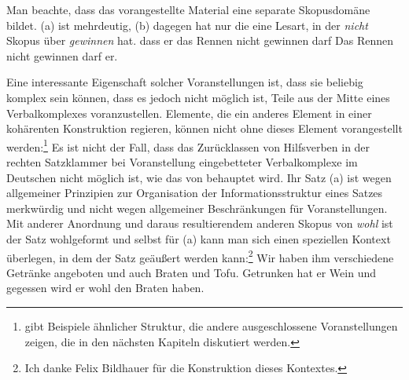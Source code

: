 Man beachte, dass das vorangestellte Material eine separate Skopusdomäne bildet.
(a) ist mehrdeutig, (b) dagegen hat nur die eine Lesart, in der \emph{nicht}
Skopus über \emph{gewinnen} hat.
\eal
\ex
dass er das Rennen nicht gewinnen darf
\ex
Das Rennen nicht gewinnen darf er.
\zl

\noindent
Eine interessante Eigenschaft solcher Voranstellungen ist, dass sie beliebig komplex
sein können, dass es jedoch nicht möglich ist, Teile aus der Mitte eines Verbalkomplexes
voranzustellen. Elemente, die ein anderes Element in einer kohärenten Konstruktion regieren,
können nicht ohne dieses Element vorangestellt werden:\footnote{
        \citet*[--721]{Haftka81a} gibt Beispiele ähnlicher Struktur,
        die andere ausgeschlossene Voranstellungen zeigen, die in den nächsten Kapiteln
        diskutiert werden.
}
\eal
{}
\label{ex-muessen-wird-er-ihr}
\zl
Es ist nicht der Fall, dass das Zurücklassen von Hilfsverben in der
rechten Satzklammer bei Voranstellung eingebetteter Verbalkomplexe im Deutschen
nicht möglich ist, wie das von \citet[]{SW94a}
behauptet wird. Ihr Satz (a) ist wegen allgemeiner Prinzipien zur Organisation
der Informationsstruktur eines Satzes merkwürdig und nicht wegen allgemeiner Beschränkungen
für Voranstellungen.
\eal
\label{bsp-gegessen-wird-er-wohl-den-braten-haben}
\zl
Mit anderer Anordnung und daraus resultierendem anderen Skopus von \emph{wohl} ist der Satz
wohlgeformt und selbst für (a) kann man sich einen speziellen Kontext überlegen, in dem der
Satz geäußert werden kann:\footnote{
  Ich danke Felix Bildhauer für die Konstruktion dieses Kontextes.
}
\ea
Wir haben ihm verschiedene Getränke angeboten und auch Braten und Tofu. Getrunken hat er Wein und
gegessen wird er wohl den Braten haben.
\z

